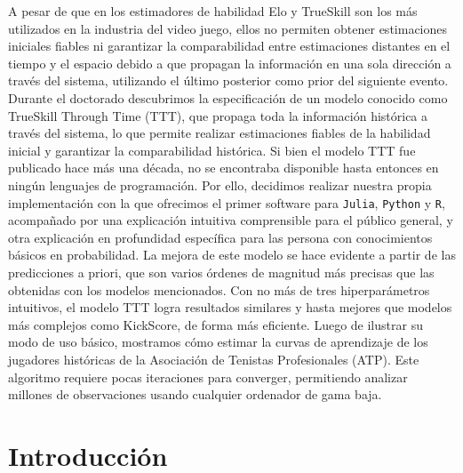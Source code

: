 \documentclass[a4paper,11pt]{book}
\theoremstyle{definition}
\newif\ifen
\newif\ifes
\newcommand{\en}[1]{\ifen#1\fi}
\newcommand{\es}[1]{\ifes#1\fi}
\begin{document}
A pesar de que en los estimadores de habilidad Elo y TrueSkill son los más utilizados en la industria del video juego, ellos no permiten obtener estimaciones iniciales fiables ni garantizar la comparabilidad entre estimaciones distantes en el tiempo y el espacio debido a que propagan la información
en una sola dirección a través del sistema, utilizando el último posterior como prior del siguiente evento.
%
Durante el doctorado descubrimos la especificación de un modelo conocido como TrueSkill Through Time (TTT), que propaga toda la información histórica a través del sistema, lo que permite realizar estimaciones fiables de la habilidad inicial y garantizar la comparabilidad histórica.
%
Si bien el modelo TTT fue publicado hace más una década, no se encontraba disponible hasta entonces en ningún lenguajes de programación.
%
Por ello, decidimos realizar nuestra propia implementación con la que ofrecimos el primer software para \texttt{Julia}, \texttt{Python} y \texttt{R}, acompa\~nado por una explicación intuitiva comprensible para el público general, y otra explicación en profundidad específica para las persona con conocimientos básicos en probabilidad.
%
La mejora de este modelo se hace evidente a partir de las predicciones a priori, que son varios órdenes de magnitud más precisas que las obtenidas con los modelos mencionados.
%
Con no más de tres hiperparámetros intuitivos, el modelo TTT logra resultados similares y hasta mejores que modelos más complejos como KickScore, de forma más eficiente.
%
Luego de ilustrar su modo de uso básico, mostramos cómo estimar la curvas de aprendizaje de los jugadores históricas de la Asociación de Tenistas Profesionales (ATP).
%
Este algoritmo requiere pocas iteraciones para converger, permitiendo analizar millones de observaciones usando cualquier ordenador de gama baja.

\section{Introducción} \label{sec:intro}

\end{document}
